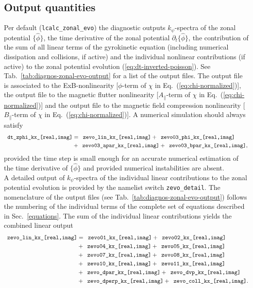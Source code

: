 \subsection{Output quantities}
\label{zevo-output-quantities}
Per default (\texttt{lcalc\_zonal\_evo}) the diagnostic outputs $k_\psi$-spectra of the zonal potential $\{\hat \phi \}$, the time derivative of the zonal potential $\partial_t \{\hat \phi \}$, the contribution of the sum of all linear terms of the gyrokinetic equation (including numerical dissipation and collisions, if active) and the individual nonlinear contributions (if active) to the zonal potential evolution (\ref{eq:dt-inverted-poisson}).
See Tab.~\ref{tab:diagnos-zonal-evo-output} for a list of the output files.
The output file  is associated to the ExB-nonlinearity [$\phi$-term of $\chi$ in Eq.~(\ref{eq:chi-normalized})], the output file  to the magnetic flutter nonlinearity [$A_\parallel$-term of $\chi$ in Eq.~(\ref{eq:chi-normalized})] and the output file  to the magnetic field compression nonlinearity [$B_\parallel$-term of $\chi$ in Eq.~(\ref{eq:chi-normalized})].
A numerical simulation should always satisfy
\begin{align}
\File{dt\_zphi\_kx\_[real,imag]} & = \File{zevo\_lin\_kx\_[real,imag]} + \File{zevo03\_phi\_kx\_[real,imag]} \nonumber \\
                                 & + \File{zevo03\_apar\_kx\_[real,imag]} + \File{zevo03\_bpar\_kx\_[real,imag]},
\end{align}
provided the time step is small enough for an accurate numerical estimation of the time derivative of $\{\hat \phi \}$ and provided numerical instabilities are absent. \\
A detailed output of $k_\psi$-spectra of the individual linear contributions to the zonal potential evolution is provided by the namelist switch \texttt{zevo\_detail}.
The nomenclature of the output files (see Tab.~\ref{tab:diagnos-zonal-evo-output}) follows the numbering of the individual terms of the complete set of equations described in Sec.~\ref{equations}.  
The sum of the individual linear contributions yields the combined linear output
\begin{align}
\File{zevo\_lin\_kx\_[real,imag]} & = \File{zevo01\_kx\_[real,imag]} + \File{zevo02\_kx\_[real,imag]} \nonumber \\
                                  & + \File{zevo04\_kx\_[real,imag]} + \File{zevo05\_kx\_[real,imag]} \nonumber \\
                                  & + \File{zevo07\_kx\_[real,imag]} + \File{zevo08\_kx\_[real,imag]} \nonumber \\
                                  & + \File{zevo10\_kx\_[real,imag]} + \File{zevo11\_kx\_[real,imag]} \nonumber \\
                                  & + \File{zevo\_dpar\_kx\_[real,imag]} + \File{zevo\_dvp\_kx\_[real,imag]} \nonumber \\
                                  & + \File{zevo\_dperp\_kx\_[real,imag]} + \File{zevo\_coll\_kx\_[real,imag]}.
\end{align}
